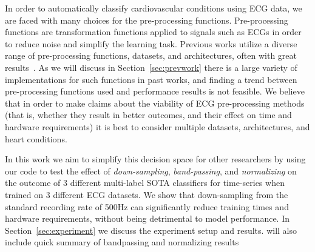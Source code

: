\documentclass[pmlr,twocolumn]{jmlr}%
\begin{document}
In order to automatically classify cardiovascular conditions using ECG data, we are faced with many choices for the pre-processing functions. Pre-processing functions are transformation functions applied to signals such as ECGs in order to reduce noise and simplify the learning task. Previous works utilize a diverse range of pre-processing functions, datasets, and architectures, often with great results~\cite{hong2022practical}. As we will discuss in Section~\ref{sec:prevwork} there is a large variety of implementations for such functions in past works, and finding a trend between pre-processing functions used and performance results is not feasible. We believe that in order to make claims about the viability of ECG pre-processing methods (that is, whether they result in better outcomes, and their effect on time and hardware requirements) it is best to consider multiple datasets, architectures, and heart conditions.  


In this work we aim to simplify this decision space for other researchers by using our code to test the effect of \textit{down-sampling}, \textit{band-passing}, and \textit{normalizing} on the outcome of 3 different multi-label SOTA classifiers for time-series when trained on 3 different ECG datasets. We show that down-sampling from the standard recording rate of 500Hz can significantly reduce training times and hardware requirements, without being detrimental to model performance. In Section~\ref{sec:experiment} we discuss the experiment setup and results.  {\color{red} will also include quick summary of bandpassing and normalizing results}\\



\begin{table}[tbp]
\label{tab:top5}
{\caption{Top 5 teams in Physionet2020 and pre-processing functions used.}}%
    
    { 
}

\end{table}
\end{document}
